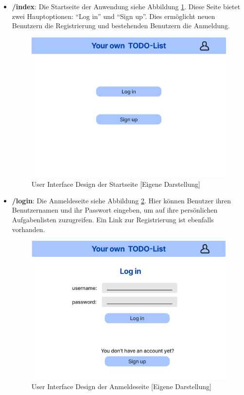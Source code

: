 \begin{itemize}
	\item \textbf{/index}: Die Startseite der Anwendung siehe Abbildung \ref{UI_index}. Diese Seite bietet zwei Hauptoptionen: "`Log in"' und "`Sign up"'. Dies ermöglicht neuen Benutzern die Registrierung und bestehenden Benutzern die Anmeldung.
	
	\begin{figure}[h]
		\centering
		\includegraphics[clip,width=0.75\linewidth]{images/index.png}
		\caption[User Interface Design der Startseite]{User Interface Design der Startseite [Eigene Darstellung]}
		\label{UI_index}
	\end{figure}	
	
	\item \textbf{/login}: Die Anmeldeseite siehe Abbildung \ref{UI_logIn}. Hier können Benutzer ihren Benutzernamen und ihr Passwort eingeben, um auf ihre persönlichen Aufgabenlisten zuzugreifen. Ein Link zur Registrierung ist ebenfalls vorhanden.
	
	\begin{figure}[h]
		\centering
		\includegraphics[clip,width=0.75\linewidth]{images/logIn.png}
		\caption[User Interface Design der Anmeldeseite]{User Interface Design der Anmeldeseite [Eigene Darstellung]}
		\label{UI_logIn}
	\end{figure}	
	

\end{itemize}
